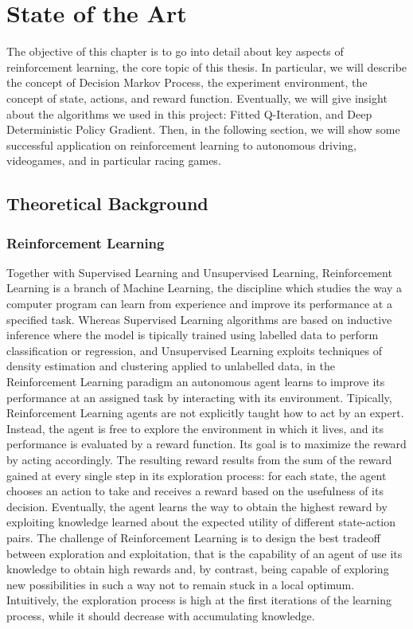 \chapter{State of the Art}
\label{State of the Art}
\thispagestyle{empty}



The objective of this chapter is to go into detail about key aspects of reinforcement learning, the core topic of this thesis. In particular, we will describe the concept of Decision Markov Process, the experiment environment, the concept of state, actions, and reward function. Eventually, we will give insight about the algorithms we used in this project: Fitted Q-Iteration, and Deep Deterministic Policy Gradient. 
Then, in the following section, we will show some successful application on reinforcement learning to autonomous driving, videogames, and in particular racing games.


\section{Theoretical Background}

\subsection{Reinforcement Learning}
Together with Supervised Learning and Unsupervised Learning, Reinforcement Learning is a branch of Machine Learning, the discipline which studies the way a computer program can learn from experience and improve its performance at a specified task. Whereas Supervised Learning algorithms are based on inductive inference where the model is tipically trained using labelled data to perform classification or regression, and Unsupervised Learning exploits techniques of density estimation and clustering applied to unlabelled data, in the Reinforcement Learning paradigm an autonomous agent learns to improve its performance at an assigned task by interacting with its environment.
Tipically, Reinforcement Learning agents are not explicitly taught how to act by an expert. Instead, the agent is free to explore the environment in which it lives, and its performance is evaluated by a reward function. Its goal is to maximize the reward by acting accordingly. The resulting reward results from the sum of the reward gained at every single step in its exploration process: for each state, the agent chooses an action to take and receives a reward based on the usefulness of its decision. Eventually, the agent learns the way to obtain the highest reward by exploiting knowledge learned about the expected utility of different state-action pairs. The challenge of Reinforcement Learning is to design the best tradeoff between exploration and exploitation, that is the capability of an agent of use its knowledge to obtain high rewards and, by contrast, being capable of exploring new possibilities in such a way not to remain stuck in a local optimum. Intuitively, the exploration process is high at the first iterations of the learning process, while it should decrease with accumulating knowledge.

